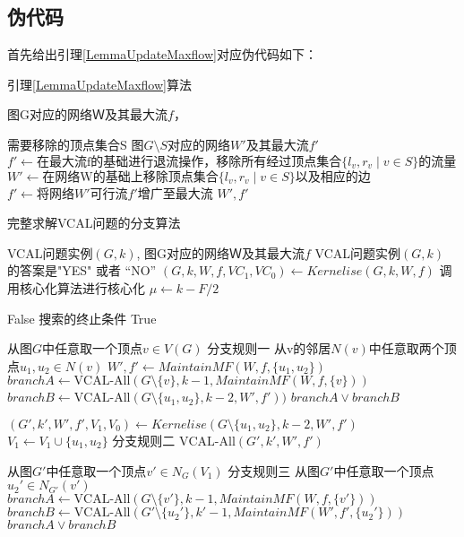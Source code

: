 \subsection{伪代码}
首先给出引理\ref{LemmaUpdateMaxflow}对应伪代码如下：
\begin{algorithm}
\caption{引理\ref{LemmaUpdateMaxflow}算法}
\begin{algorithmic}[1]
\Require 图G对应的网络Ｗ及其最大流$f$，

需要移除的顶点集合S
\Ensure  图$G\setminus S$对应的网络$W'$及其最大流$f'$
    \State $f' \gets \text{在最大流f的基础进行退流操作，移除所有经过顶点集合$\{l_v, r_v\;|\;v \in S\}$的流量}$
    \State $W' \gets \text{在网络W的基础上移除顶点集合$\{l_v, r_v\;|\;v \in S\}$以及相应的边}$
    \State $f' \gets \text{将网络$W'$可行流$f'$增广至最大流}$
    \State \Return $W', f'$
\EndFunction
\end{algorithmic}
\end{algorithm}

\begin{algorithm}
\caption{完整求解VCAL问题的分支算法}
\begin{algorithmic}[1]
\Require VCAL问题实例$(G,k)$, 图G对应的网络Ｗ及其最大流$f$
\Ensure  VCAL问题实例$(G,k)$ 的答案是"YES" 或者 “NO”
    \State $(G, k, W, f, VC_1, VC_0) \gets Kernelise(G, k, W, f)$
    \Comment 调用核心化算法进行核心化
    \State $\mu \gets k - F / 2$

     \Return False \Comment 搜索的终止条件
     \Return True
    \EndIf

    \State 从图$G$中任意取一个顶点$v \in V(G)$ \Comment 分支规则一
    \State 从v的邻居$N(v)$中任意取两个顶点$u_1, u_2 \in N(v)$
    \State $W', f' \gets MaintainMF(W, f, \{u_1, u_2\})$
        \State $branchA \gets \text{VCAL-All}(G\setminus\{v\}, k - 1, MaintainMF(W, f, \{v\}))$
        \State $branchB \gets \text{VCAL-All}(G\setminus\{u_1, u_2\}, k - 2, W', f'))$
        \State \Return $branchA \vee branchB$
    \EndIf

    \State $(G', k', W', f', V_1, V_0) \gets Kernelise(G\setminus\{u_1, u_2\}, k - 2, W', f')$
    \State $V_1 \gets V_1 \cup \{u_1, u_2\}$
     \Comment 分支规则二
        \State \Return $\text{VCAL-All}(G', k', W', f')$
    \EndIf

    \State 从图$G'$中任意取一个顶点$v' \in N_G(V_1)$ \Comment 分支规则三
    \State 从图$G'$中任意取一个顶点$u_2' \in N_{G'}(v')$
    \State $branchA \gets \text{VCAL-All}(G\setminus\{v'\}, k - 1, MaintainMF(W, f, \{v'\}))$
    \State $branchB \gets \text{VCAL-All}(G'\setminus\{u_2'\}, k' - 1, MaintainMF(W', f', \{u_2'\}))$
    \State \Return $branchA \vee branchB$

\EndFunction
\end{algorithmic}
\end{algorithm} 